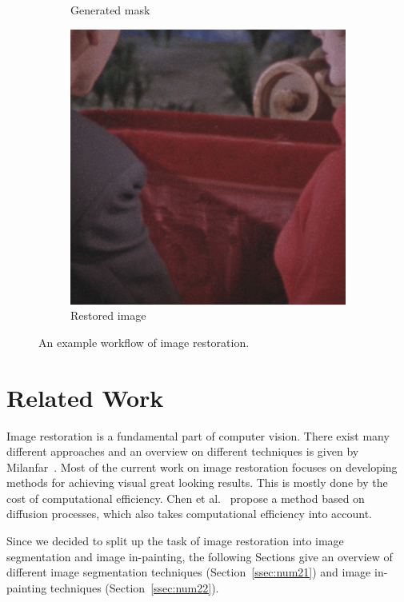 \begin{figure}[H]
\begin{subfigure}{.3\textwidth}
		\caption[figure]{Generated mask}
		\label{fig:intro_flow2}
	\end{subfigure}
	\begin{subfigure}{.3\textwidth}
		\centering
		\includegraphics[width=\linewidth]{introduction/output.png}
		\caption[figure]{Restored image}
		\label{fig:intro_flow3}
	\end{subfigure}
	\caption[figure]{An example workflow of image restoration.}
	\label{fig:intro_flow}
\end{figure}


\section{Related Work}
\label{sec:num2}

Image restoration is a fundamental part of computer vision. There exist many different approaches and an overview on different techniques is given by Milanfar~\cite{Milanfar13}. Most of the current work on image restoration focuses on developing methods for achieving visual great looking results. This is mostly done by the cost of computational efficiency. Chen et al.~\cite{chen17} propose a method based on diffusion processes, which also takes computational efficiency into account.

Since we decided to split up the task of image restoration into image segmentation and image in-painting, the following Sections give an overview of different image segmentation techniques (Section~\ref{ssec:num21}) and image in-painting techniques (Section~\ref{ssec:num22}).



